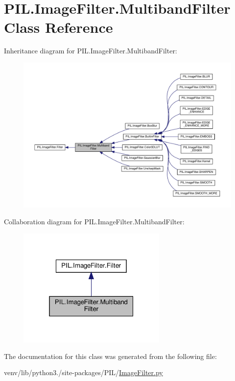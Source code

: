 \hypertarget{classPIL_1_1ImageFilter_1_1MultibandFilter}{}\section{P\+I\+L.\+Image\+Filter.\+Multiband\+Filter Class Reference}
\label{classPIL_1_1ImageFilter_1_1MultibandFilter}


Inheritance diagram for P\+I\+L.\+Image\+Filter.\+Multiband\+Filter\+:
\nopagebreak
\begin{figure}[H]
\begin{center}
\leavevmode
\includegraphics[width=350pt]{classPIL_1_1ImageFilter_1_1MultibandFilter__inherit__graph}
\end{center}
\end{figure}


Collaboration diagram for P\+I\+L.\+Image\+Filter.\+Multiband\+Filter\+:
\nopagebreak
\begin{figure}[H]
\begin{center}
\leavevmode
\includegraphics[width=208pt]{classPIL_1_1ImageFilter_1_1MultibandFilter__coll__graph}
\end{center}
\end{figure}


The documentation for this class was generated from the following file\+:\begin{DoxyCompactItemize}
\item 
venv/lib/python3./site-\/packages/\+P\+I\+L/\hyperlink{ImageFilter_8py}{Image\+Filter.\+py}\end{DoxyCompactItemize}
